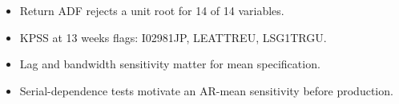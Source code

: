 \begin{itemize}\item Return ADF rejects a unit root for 14 of 14 variables.\item KPSS at 13 weeks flags: I02981JP, LEATTREU, LSG1TRGU.\item Lag and bandwidth sensitivity matter for mean specification.\item Serial-dependence tests motivate an AR-mean sensitivity before production.\end{itemize}
